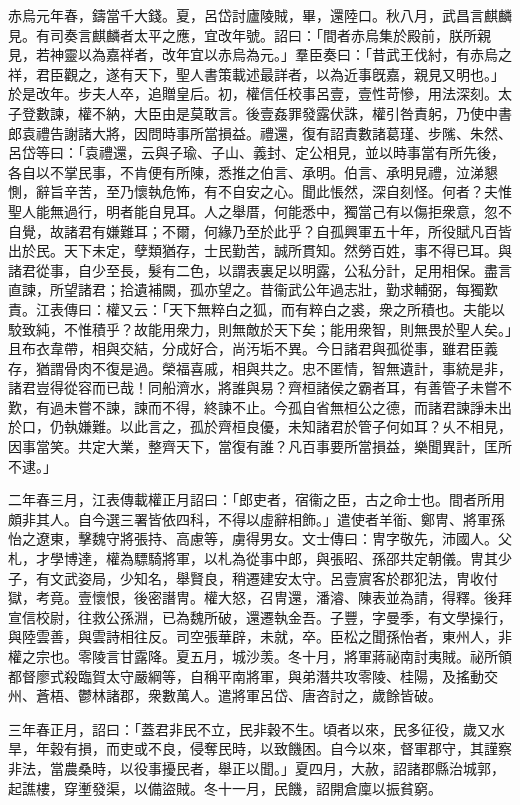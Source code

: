 \begin{pinyinscope}
赤烏元年春，鑄當千大錢。夏，呂岱討廬陵賊，畢，還陸口。秋八月，武昌言麒麟見。有司奏言麒麟者太平之應，宜改年號。詔曰：「間者赤烏集於殿前，朕所親見，若神靈以為嘉祥者，改年宜以赤烏為元。」羣臣奏曰：「昔武王伐紂，有赤烏之祥，君臣觀之，遂有天下，聖人書策載述最詳者，以為近事旣嘉，親見又明也。」於是改年。步夫人卒，追贈皇后。初，權信任校事呂壹，壹性苛慘，用法深刻。太子登數諫，權不納，大臣由是莫敢言。後壹姦罪發露伏誅，權引咎責躬，乃使中書郎袁禮告謝諸大將，因問時事所當損益。禮還，復有詔責數諸葛瑾、步隲、朱然、呂岱等曰：「袁禮還，云與子瑜、子山、義封、定公相見，並以時事當有所先後，各自以不掌民事，不肯便有所陳，悉推之伯言、承明。伯言、承明見禮，泣涕懇惻，辭旨辛苦，至乃懷執危怖，有不自安之心。聞此悵然，深自刻怪。何者？夫惟聖人能無過行，明者能自見耳。人之舉厝，何能悉中，獨當己有以傷拒衆意，忽不自覺，故諸君有嫌難耳；不爾，何緣乃至於此乎？自孤興軍五十年，所役賦凡百皆出於民。天下未定，孽類猶存，士民勤苦，誠所貫知。然勞百姓，事不得已耳。與諸君從事，自少至長，髮有二色，以謂表裏足以明露，公私分計，足用相保。盡言直諫，所望諸君；拾遺補闕，孤亦望之。昔衞武公年過志壯，勤求輔弼，每獨歎責。江表傳曰：權又云：「天下無粹白之狐，而有粹白之裘，衆之所積也。夫能以駮致純，不惟積乎？故能用衆力，則無敵於天下矣；能用衆智，則無畏於聖人矣。」且布衣韋帶，相與交結，分成好合，尚汚垢不異。今日諸君與孤從事，雖君臣義存，猶謂骨肉不復是過。榮福喜戚，相與共之。忠不匿情，智無遺計，事統是非，諸君豈得從容而已哉！同船濟水，將誰與易？齊桓諸侯之霸者耳，有善管子未嘗不歎，有過未嘗不諫，諫而不得，終諫不止。今孤自省無桓公之德，而諸君諫諍未出於口，仍執嫌難。以此言之，孤於齊桓良優，未知諸君於管子何如耳？乆不相見，因事當笑。共定大業，整齊天下，當復有誰？凡百事要所當損益，樂聞異計，匡所不逮。」

二年春三月，江表傳載權正月詔曰：「郎吏者，宿衞之臣，古之命士也。間者所用頗非其人。自今選三署皆依四科，不得以虛辭相飾。」遣使者羊衜、鄭冑、將軍孫怡之遼東，擊魏守將張持、高慮等，虜得男女。文士傳曰：冑字敬先，沛國人。父札，才學博達，權為驃騎將軍，以札為從事中郎，與張昭、孫邵共定朝儀。冑其少子，有文武姿局，少知名，舉賢良，稍遷建安太守。呂壹賔客於郡犯法，冑收付獄，考竟。壹懷恨，後密譖冑。權大怒，召冑還，潘濬、陳表並為請，得釋。後拜宣信校尉，往救公孫淵，已為魏所破，還遷執金吾。子豐，字曼季，有文學操行，與陸雲善，與雲詩相往反。司空張華辟，未就，卒。臣松之聞孫怡者，東州人，非權之宗也。零陵言甘露降。夏五月，城沙羡。冬十月，將軍蔣祕南討夷賊。祕所領都督廖式殺臨賀太守嚴綱等，自稱平南將軍，與弟潛共攻零陵、桂陽，及搖動交州、蒼梧、鬱林諸郡，衆數萬人。遣將軍呂岱、唐咨討之，歲餘皆破。

三年春正月，詔曰：「蓋君非民不立，民非穀不生。頃者以來，民多征役，歲又水旱，年穀有損，而吏或不良，侵奪民時，以致饑困。自今以來，督軍郡守，其謹察非法，當農桑時，以役事擾民者，舉正以聞。」夏四月，大赦，詔諸郡縣治城郭，起譙樓，穿壍發渠，以備盜賊。冬十一月，民饑，詔開倉廩以振貧窮。


\end{pinyinscope}
